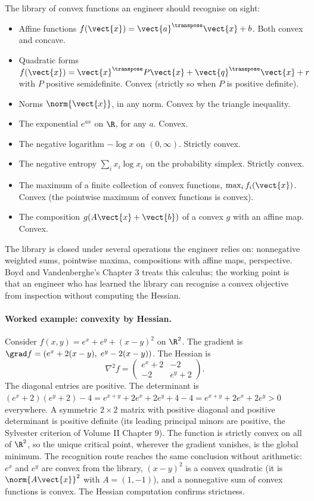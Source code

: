 The library of convex functions an engineer should recognise on
sight:

\begin{itemize}[leftmargin=*]
  \item Affine functions $f(\vect{x}) = \vect{a}^{\transpose}
    \vect{x} + b$. Both convex and concave.
  \item Quadratic forms $f(\vect{x}) = \vect{x}^{\transpose} P
    \vect{x} + \vect{q}^{\transpose} \vect{x} + r$ with $P$
    positive semidefinite. Convex (strictly so when $P$ is
    positive definite).
  \item Norms $\norm{\vect{x}}$, in any norm. Convex by the
    triangle inequality.
  \item The exponential $e^{a x}$ on $\R$, for any $a$. Convex.
  \item The negative logarithm $-\log x$ on $(0, \infty)$.
    Strictly convex.
  \item The negative entropy $\sum_{i} x_{i} \log x_{i}$ on the
    probability simplex. Strictly convex.
  \item The maximum of a finite collection of convex functions,
    $\max_{i} f_{i}(\vect{x})$. Convex (the pointwise maximum
    of convex functions is convex).
  \item The composition $g(A \vect{x} + \vect{b})$ of a convex
    $g$ with an affine map. Convex.
\end{itemize}

The library is closed under several operations the engineer
relies on: nonnegative weighted sums, pointwise maxima,
compositions with affine maps, perspective. Boyd and
Vandenberghe's Chapter 3 treats this calculus; the working point
is that an engineer who has learned the library can recognise a
convex objective from inspection without computing the Hessian.

\paragraph{Worked example: convexity by Hessian.}
Consider $f(x, y) = e^{x} + e^{y} + (x - y)^{2}$ on $\R^{2}$. The
gradient is $\grad f = (e^{x} + 2(x - y), \; e^{y} - 2(x - y))$.
The Hessian is
\[
\nabla^{2} f =
\begin{pmatrix}
e^{x} + 2 & -2 \\
-2 & e^{y} + 2
\end{pmatrix}.
\]
The diagonal entries are positive. The determinant is
$(e^{x} + 2)(e^{y} + 2) - 4 = e^{x + y} + 2 e^{x} + 2 e^{y} + 4 -
4 = e^{x+y} + 2 e^{x} + 2 e^{y} > 0$ everywhere. A symmetric
$2 \times 2$ matrix with positive diagonal and positive
determinant is positive definite (its leading principal minors
are positive, the Sylvester criterion of Volume II Chapter 9).
The function is strictly convex on all of $\R^{2}$, so the unique
critical point, wherever the gradient vanishes, is the global
minimum. The recognition route reaches the same conclusion
without arithmetic: $e^{x}$ and $e^{y}$ are convex from the
library, $(x - y)^{2}$ is a convex quadratic (it is
$\norm{A \vect{x}}^{2}$ with $A = (1, -1)$), and a nonnegative sum
of convex functions is convex. The Hessian computation confirms
strictness.


